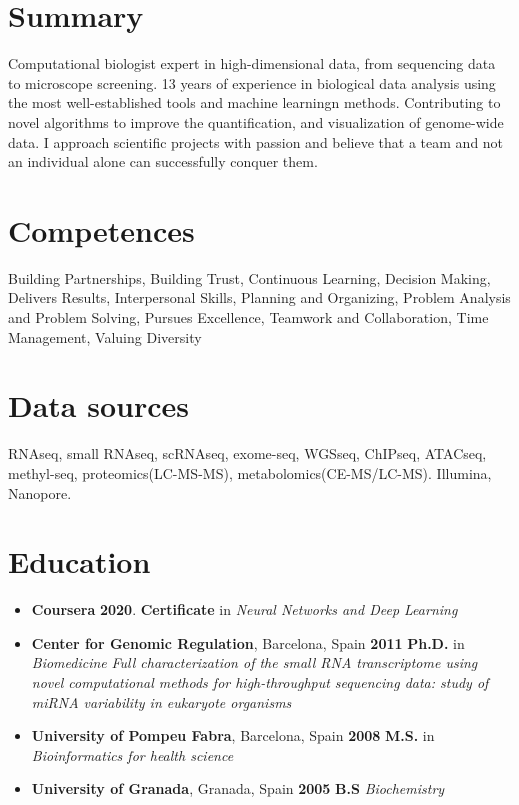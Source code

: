 \hypertarget{summary}{%
\section{Summary}\label{summary}}

Computational biologist expert in high-dimensional data, from sequencing
data to microscope screening. 13 years of experience in biological data
analysis using the most well-established tools and machine learningn methods.
Contributing to novel algorithms to improve the quantification,
and visualization of genome-wide data. 
I approach scientific projects with passion and believe that a
team and not an individual alone can successfully conquer them.

\hypertarget{competences}{%
\section{Competences}\label{competences}}

Building Partnerships, Building Trust, Continuous Learning, Decision
Making, Delivers Results, Interpersonal Skills, Planning and Organizing,
Problem Analysis and Problem Solving, Pursues Excellence, Teamwork and
Collaboration, Time Management, Valuing Diversity

\hypertarget{Data sources}{%
\section{Data sources}\label{data}}

RNAseq, small RNAseq, scRNAseq, exome-seq, WGSseq, ChIPseq, ATACseq, methyl-seq, proteomics(LC-MS-MS), metabolomics(CE-MS/LC-MS). Illumina, Nanopore.

\hypertarget{education}{%
\section{Education}\label{education}}

\begin{itemize}
\tightlist
\item \textbf{Coursera} \hfill \textbf{2020}.
  \newline
  \textbf{Certificate} in \textit{Neural Networks and Deep Learning}
\item
  \textbf{Center for Genomic Regulation}, Barcelona, Spain \hfill \textbf{2011}
  \newline
  \textbf{Ph.D.} in \textit{Biomedicine}
  \newline
  \textit{Full characterization of the small RNA transcriptome using novel computational methods for high-throughput
sequencing data: study of  miRNA variability in eukaryote organisms}
\item
  \textbf{University of Pompeu Fabra}, Barcelona, Spain \hfill \textbf{2008}
  \newline
  \textbf{M.S.} in \textit{Bioinformatics for health science}
\item
  \textbf{University of Granada}, Granada, Spain \hfill \textbf{2005}
  \newline
  \textbf{B.S} \textit{Biochemistry}
\end{itemize}

